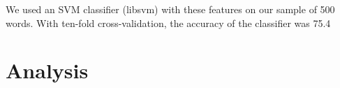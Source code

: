 \documentclass[11pt]{article}
\begin{document}
We used an SVM classifier (libsvm) with these features on our sample of 500 words. With ten-fold cross-validation, the accuracy of the classifier was 75.4%

%
%
% 
% 


\section{Analysis}



%
%
\end{document}
